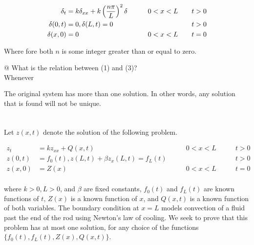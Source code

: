 \documentclass[10pt]{article}
\begin{document}
\begin{easylist}[enumerate]
    \begin{align}\label{1:delta}
        \delta_t &= k \delta_{xx} + k \pren{\frac{n\pi}{L}}^2 \delta \qquad & 0 < x < L \qquad & t > 0 \nonumber \\
        \delta(0, t) &= 0, \delta(L, t) = 0 \qquad && t > 0\\
        \delta(x, 0) &= 0 \qquad & 0 < x < L \qquad & t = 0 \nonumber
    \end{align}

    Where fore both $n$ is some integer greater than or equal to zero.

    @ What is the relation between (1) and (3)?\\

    Whenever 


    The original system has more than one solution. In other words, any solution that is found will not be unique.
\end{easylist}

\newpage
\section{}

Let $z(x, t)$ denote the solution of the following problem.

\begin{align*}
    z_t &= k z_{xx} + Q(x, t) \qquad & 0 < x < L \qquad & t > 0\\
    z(0, t) &= f_0(t), z(L, t) + \beta z_x(L, t) = f_L(t)\qquad && t > 0\\
    z(x, 0) &= Z(x) \qquad & 0 < x < L \qquad & t = 0\\
\end{align*}

where $k >0, L>0$, and $\beta$ are fixed constants, $f_0(t)$ and $f_L(t)$ are known functions of $t$, $Z(x)$ is a known
function of $x$, and $Q(x, t)$ is a known function of both variables. The boundary condition at $x=L$ models convection
of a fluid past the end of the rod using Newton's law of cooling. We seek to prove that this problem has at most one
solution, for any choice of the functions $\{f_0(t), f_L(t), Z(x), Q(x, t)\}$.
\end{document}
